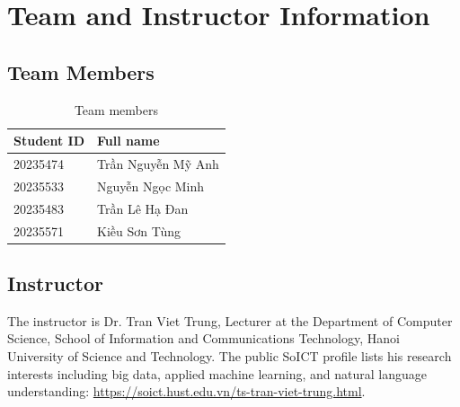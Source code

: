 \section{Team and Instructor Information}

\subsection{Team Members}
\begin{table}[h]
\centering
\caption{Team members}
\begin{tabular}{ll}
\toprule
\textbf{Student ID} & \textbf{Full name} \\
\midrule
20235474 & Trần Nguyễn Mỹ Anh \\
20235533 & Nguyễn Ngọc Minh \\
20235483 & Trần Lê Hạ Đan \\
20235571 & Kiều Sơn Tùng \\
\bottomrule
\end{tabular}
\end{table}

\subsection{Instructor}
The instructor is Dr. Tran Viet Trung, Lecturer at the Department of Computer
Science, School of Information and Communications Technology, Hanoi University
of Science and Technology. The public SoICT profile lists his research interests
including big data, applied machine learning, and natural language
understanding:
\url{https://soict.hust.edu.vn/ts-tran-viet-trung.html}.
